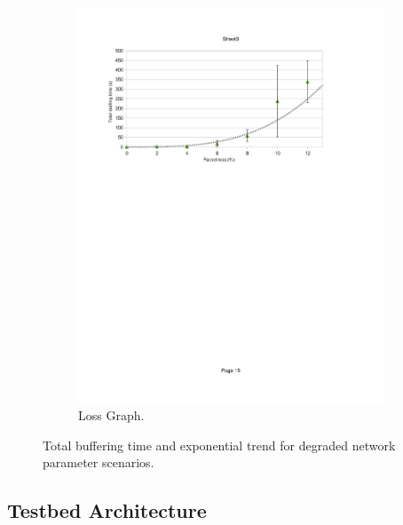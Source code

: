 \begin{figure}[htbp]
    	\begin{subfigure}[b]{1.00\textwidth}
                \centering
                \includegraphics[width=\textwidth]{images/loss.pdf}
                \caption{Loss Graph.}
                \label{c3:fig:lossseries}
        \end{subfigure}
\caption{Total buffering time and exponential trend for degraded network parameter scenarios.}
\label{c3:fig:seriesgraphs}
\end{figure}




\subsection{Testbed Architecture}

